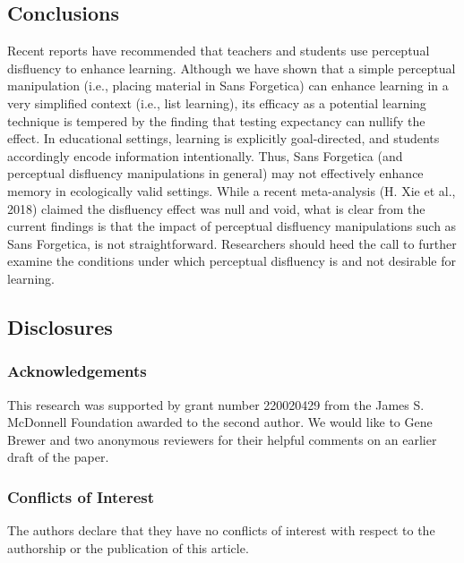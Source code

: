 \documentclass[
  english,
  jou]{apa7}
\begin{document}
\hypertarget{conclusions}{%
\subsection{Conclusions}\label{conclusions}}

Recent reports have recommended that teachers and students use perceptual disfluency to enhance learning. Although we have shown that a simple perceptual manipulation (i.e., placing material in Sans Forgetica) can enhance learning in a very simplified context (i.e., list learning), its efficacy as a potential learning technique is tempered by the finding that testing expectancy can nullify the effect. In educational settings, learning is explicitly goal-directed, and students accordingly encode information intentionally. Thus, Sans Forgetica (and perceptual disfluency manipulations in general) may not effectively enhance memory in ecologically valid settings. While a recent meta-analysis (H. Xie et al., 2018) claimed the disfluency effect was null and void, what is clear from the current findings is that the impact of perceptual disfluency manipulations such as Sans Forgetica, is not straightforward. Researchers should heed the call to further examine the conditions under which perceptual disfluency is and not desirable for learning.

\newpage

\hypertarget{disclosures}{%
\subsection{Disclosures}\label{disclosures}}

\hypertarget{acknowledgements}{%
\subsubsection{Acknowledgements}\label{acknowledgements}}

This research was supported by grant number 220020429 from the James S. McDonnell Foundation awarded to the second author. We would like to Gene Brewer and two anonymous reviewers for their helpful comments on an earlier draft of the paper.

\hypertarget{conflicts-of-interest}{%
\subsubsection{Conflicts of Interest}\label{conflicts-of-interest}}

The authors declare that they have no conflicts of interest with respect to the authorship or the publication of this article.
\newline
\end{document}
